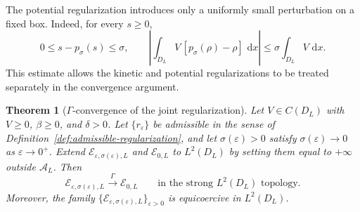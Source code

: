 \documentclass[11pt]{article}
\newcommand{\A}{\mathcal{A}}
\newcommand{\E}{\mathcal{E}}
\newcommand{\dd}{\,\mathrm{d}}
\newcommand{\eps}{\varepsilon}
\newcommand{\sig}{\sigma}
\theoremstyle{plain}
\newtheorem{theorem}{Theorem}[section]
\theoremstyle{definition}
\numberwithin{equation}{section}
\begin{document}
The potential regularization introduces only a uniformly small
perturbation on a fixed box. Indeed, for every $s\ge0$,
\begin{equation}
\label{eq:potential-energy-defect}
0\le s-p_\sig(s)\le\sig,
\qquad
\left|
\int_{D_L}
V\,[p_\sig(\rho)-\rho]\,\dd x
\right|
\le
\sig\int_{D_L}V\,\dd x.
\end{equation}
This estimate allows the kinetic and potential regularizations to be
treated separately in the convergence argument.

\begin{theorem}[$\Gamma$-convergence of the joint regularization]
\label{thm:gamma-joint}
Let $V\in C(D_L)$ with $V\ge0$, $\beta\ge0$, and $\delta>0$.
Let $\{r_\eps\}$ be admissible in the sense of
Definition~\ref{def:admissible-regularization}, and let
$\sig(\eps)>0$ satisfy
$\sig(\eps)\to0$ as $\eps\to0^+$.
Extend $\E_{\eps,\sig(\eps),L}$ and $\E_{0,L}$ to $L^2(D_L)$
by setting them equal to $+\infty$ outside $\A_L$.
Then
\[
\E_{\eps,\sig(\eps),L}
\xrightarrow{\Gamma}
\E_{0,L}
\qquad
\text{in the strong }L^2(D_L)\text{ topology}.
\]
Moreover, the family
$\{\E_{\eps,\sig(\eps),L}\}_{\eps>0}$
is equicoercive in $L^2(D_L)$.
\end{theorem}
\end{document}
